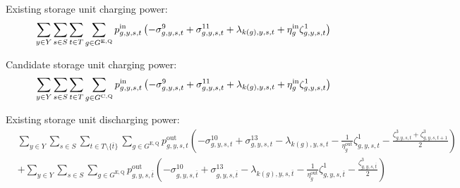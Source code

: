 \documentclass{article}
\newcommand{\sStorageExisting}{G^{\mathrm{E,Q}}}
\newcommand{\sStorageCandidate}{G^{\mathrm{C,Q}}}
\newcommand{\sYears}{Y}
\newcommand{\sScenarios}{S}
\newcommand{\sIntervals}{T}
\newcommand{\iGenerator}{g}
\newcommand{\iYear}{y}
\newcommand{\iScenario}{s}
\newcommand{\iInterval}{t}
\newcommand{\iIntervalTerminal}{\overline{\iInterval}}
\newcommand{\iZone}{z}
\newcommand{\cStorageUnitEfficiencyCharging}{\eta_{\iGenerator}^{\mathrm{in}}}
\newcommand{\cStorageUnitEfficiencyDischarging}{\eta_{\iGenerator}^{\mathrm{out}}}
\newcommand{\vPowerIn}[1][\iGenerator,\iYear,\iScenario,\iInterval]{p^{\mathrm{in}}_{#1}}
\newcommand{\vPowerOut}[1][\iGenerator,\iYear,\iScenario,\iInterval]{p^{\mathrm{out}}_{#1}}
\newcommand{\dNonNegativeCharging}[1][\iGenerator,\iYear,\iScenario,\iInterval]{\sigma_{#1}^{9}}
\newcommand{\dNonNegativeDischarging}[1][\iGenerator,\iYear,\iScenario,\iInterval]{\sigma_{#1}^{10}}
\newcommand{\dMaxChargingRateExisting}[1][\iGenerator,\iYear,\iScenario,\iInterval]{\sigma_{#1}^{11}}
\newcommand{\dMaxDischargingRateExisting}[1][\iGenerator,\iYear,\iScenario,\iInterval]{\sigma_{#1}^{13}}
\newcommand{\dPowerBalance}[1][\iZone,\iYear,\iScenario,\iInterval]{\lambda_{#1}}
\newcommand{\dStorageEnergyTransition}[1][\iGenerator,\iYear,\iScenario,\iInterval]{\zeta_{#1}^{1}}
\newcommand{\dStorageEnergyOutput}[1][\iGenerator,\iYear,\iScenario,\iInterval]{\zeta_{#1}^{3}}
\begin{document}
Existing storage unit charging power:
\begin{equation}
	\sumIntervals \sum\limits_{\iGenerator \in \sStorageExisting} \vPowerIn \left( - \dNonNegativeCharging + \dMaxChargingRateExisting + \dPowerBalance[k(\iGenerator),\iYear,\iScenario,\iInterval] + \cStorageUnitEfficiencyCharging\dStorageEnergyTransition\right)
\end{equation}

Candidate storage unit charging power:
\begin{equation}
	\sumIntervals \sum\limits_{\iGenerator \in \sStorageCandidate} \vPowerIn \left( - \dNonNegativeCharging + \dMaxChargingRateExisting + \dPowerBalance[k(\iGenerator),\iYear,\iScenario,\iInterval] + \cStorageUnitEfficiencyCharging\dStorageEnergyTransition\right)
\end{equation}

Existing storage unit discharging power:
\begin{align}
	& \sum\limits_{\iYear \in \sYears}\sum\limits_{\iScenario \in \sScenarios}\sum\limits_{\iInterval \in \sIntervals \setminus \{\iIntervalTerminal\}} \sum\limits_{\iGenerator \in \sStorageExisting} \vPowerOut \left( - \dNonNegativeDischarging + \dMaxDischargingRateExisting - \dPowerBalance[k(\iGenerator),\iYear,\iScenario,\iInterval] - \frac{1}{\cStorageUnitEfficiencyDischarging} \dStorageEnergyTransition - \frac{\dStorageEnergyOutput + \dStorageEnergyOutput[\iGenerator,\iYear,\iScenario,\iInterval+1]}{2}\right) \nonumber\\
	& + \sum\limits_{\iYear \in \sYears}\sum\limits_{\iScenario \in \sScenarios} \sum\limits_{\iGenerator \in \sStorageExisting} \vPowerOut[\iGenerator,\iYear,\iScenario,\iIntervalTerminal] \left( - \dNonNegativeDischarging[\iGenerator,\iYear,\iScenario,\iIntervalTerminal] + \dMaxDischargingRateExisting[\iGenerator,\iYear,\iScenario,\iIntervalTerminal] - \dPowerBalance[k(\iGenerator),\iYear,\iScenario,\iIntervalTerminal] - \frac{1}{\cStorageUnitEfficiencyDischarging} \dStorageEnergyTransition[\iGenerator,\iYear,\iScenario,\iIntervalTerminal] - \frac{\dStorageEnergyOutput[\iGenerator,\iYear,\iScenario,\iIntervalTerminal]}{2}\right)\\\nonumber
\end{align}
\end{document}
